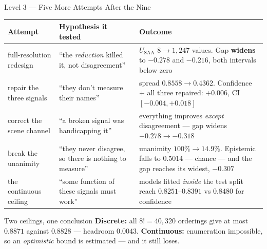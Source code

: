 \documentclass[aspectratio=169,11pt]{beamer}
\begin{document}
\begin{frame}{Level 3 --- Five More Attempts After the Nine}
\scriptsize
\begin{center}
\tiny
\begin{tabular}{@{}l p{3.5cm} p{4.5cm}@{}}
\toprule
\textbf{Attempt} & \textbf{Hypothesis it tested} & \textbf{Outcome} \\
\midrule
full-resolution redesign & ``the \emph{reduction} killed it, not disagreement'' & $U_{\text{SAA}}$ $8 \to 1{,}247$ values. Gap \textbf{widens} to $-0.278$ and $-0.216$, both intervals below zero \\
\addlinespace
repair the three signals & ``they don't measure their names'' & spread $0.8558 \to \mathbf{0.4362}$. Confidence $+$ all three repaired: $+0.006$, CI $[-0.004,+0.018]$ \\
\addlinespace
correct the scene channel & ``a broken signal was handicapping it'' & everything improves \emph{except} disagreement --- gap widens $-0.278 \to \mathbf{-0.318}$ \\
\addlinespace
break the unanimity & ``they never disagree, so there is nothing to measure'' & unanimity $100\% \to \mathbf{14.9\%}$. Epistemic falls to $\mathbf{0.5014}$ --- chance --- and the gap reaches its widest, $-0.307$ \\
\addlinespace
the continuous ceiling & ``some function of these signals must work'' & models fitted \emph{inside} the test split reach $0.8251$--$0.8391$ vs $\mathbf{0.8480}$ for confidence \\
\bottomrule
\end{tabular}
\end{center}
\vspace{-1mm}
\begin{alertblock}{\scriptsize Two ceilings, one conclusion}
\scriptsize \textbf{Discrete:} all $8!=40{,}320$ orderings give at most $0.8871$ against $0.8828$ --- headroom $\mathbf{0.0043}$. \textbf{Continuous:} enumeration impossible, so an \emph{optimistic} bound is estimated --- and it still loses.
\end{alertblock}
\end{frame}
\end{document}
